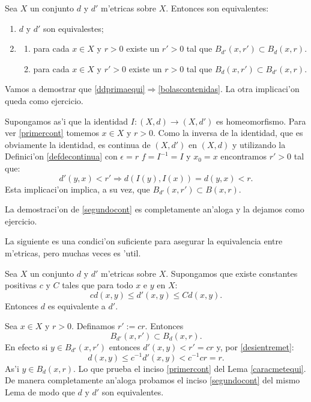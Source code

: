 \begin{lema}\label{caracmetequi} Sea $X$ un conjunto $d$ y $d'$ m'etricas sobre $X$.
Entonces son equivalentes:
\begin{enumerate}
\item\label{ddprimaequi} $d$ y $d'$ son equivalestes;
\item\label{bolascontenidas} \begin{enumerate}
        \item\label{primercont} para cada $x\in X$ y  $r>0$ existe un $r'>0$ tal que
        $B_{d'}(x,r')\subset B_d(x,r)$.
        \item\label{segundocont} para cada $x\in X$ y  $r'>0$ existe un $r>0$ tal que
        $B_{d}(x,r')\subset B_{d'}(x,r)$.
      \end{enumerate}
\end{enumerate}
\end{lema}

\begin{demo} Vamos a demostrar que
\ref{ddprimaequi}$\Rightarrow$\ref{bolascontenidas}. La otra
implicaci'on queda como ejercicio.

Supongamos as'i que la identidad $I:(X,d)\to (X,d')$ es
homeomorfismo. Para ver \ref{primercont} tomemos $x\in X$ y
$r>0$. Como la inversa de la identidad, que es obviamente la
identidad, es continua de $(X,d')$ en $(X,d)$ y utilizando la
Definici'on \ref{defdecontinua} con $\epsilon=r$ $f=I^{-1}=I$ y
$x_0=x$ encontramos $r'>0$ tal que:
\[
    d'(y,x)< r'\Rightarrow d(I(y),I(x))=d(y,x)<r.
\]
Esta implicaci'on implica, a su vez, que $B_{d'}(x,r')\subset
B(x,r)$.

La demostraci'on de \ref{segundocont} es completamente an'aloga y
la dejamos como ejercicio.
\end{demo}

La siguiente es una condici'on suficiente para asegurar la
equivalencia entre m'etricas, pero muchas veces es 'util.

\begin{lema}  Sea $X$ un conjunto $d$ y $d'$ m'etricas sobre $X$.
Supongamos que existe constantes positivas $c$ y $C$ tales que
para todo $x$ e $y$ en $X$:
\begin{equation}\label{desientremet}
    c d(x,y)\leq d'(x,y) \leq C d(x,y).
\end{equation}
Entonces $d$ es equivalente a $d'$.
\end{lema}
\begin{demo} Sea $x\in X$ y $r>0$. Definamos $r':=cr$. Entonces
\[
    B_{d'}(x,r')\subset B_d(x,r).
\]
En efecto si $y\in B_{d'}(x,r')$ entonces $d'(x,y)<r'=cr$ y, por
\eqref{desientremet}:
\[
    d(x,y)\leq c^{-1}d'(x,y)< c^{-1}cr=r.
\]
As'i $y\in B_d(x,r)$. Lo que prueba el inciso \ref{primercont} del
Lema \ref{caracmetequi}. De manera completamente an'aloga probamos
el inciso \ref{segundocont} del mismo Lema de modo que $d$ y $d'$
son equivalentes.\end{demo}

